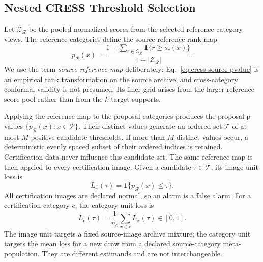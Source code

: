 \subsection{Nested CRESS Threshold Selection}\label{sec:cress-threshold-selection}
Let $\mathcal{Z}_{\mathcal{R}}$ be the pooled normalized scores from the selected reference-category views. The reference categories define the source-reference rank map
\begin{equation}\label{eq:cress-source-pvalue}
    p_{\mathcal{R}}(x)
    =\frac{1+\sum_{r\in\mathcal{Z}_{\mathcal{R}}}
    \mathbf{1}\{r\geq\widetilde{s}_c(x)\}}
    {1+|\mathcal{Z}_{\mathcal{R}}|}.
\end{equation}
We use the term \emph{source-reference map} deliberately: Eq.~\eqref{eq:cress-source-pvalue} is an empirical rank transformation on the source archive, and cross-category conformal validity is not presumed. Its finer grid arises from the larger reference-score pool rather than from the $k$ target supports.

Applying the reference map to the proposal categories produces the proposal p-values $\{p_{\mathcal R}(x):x\in\mathcal P\}$. Their distinct values generate an ordered set $\mathcal{T}$ of at most $M$ positive candidate thresholds. If more than $M$ distinct values occur, a deterministic evenly spaced subset of their ordered indices is retained. Certification data never influence this candidate set. The same reference map is then applied to every certification image. Given a candidate $\tau\in\mathcal T$, its image-unit loss is
\begin{equation}\label{eq:cress-image-loss}
    L_x(\tau)=\mathbf{1}\{p_{\mathcal{R}}(x)\leq\tau\}.
\end{equation}
All certification images are declared normal, so an alarm is a false alarm. For a certification category $c$, the category-unit loss is
\begin{equation}\label{eq:cress-category-loss}
    L_c(\tau)=\frac{1}{n_c}\sum_{x\in c}L_x(\tau)\in[0,1].
\end{equation}
The image unit targets a fixed source-image archive mixture; the category unit targets the mean loss for a new draw from a declared source-category meta-population. They are different estimands and are not interchangeable.

